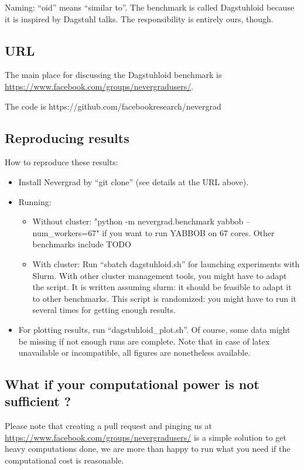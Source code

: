 \documentclass{article}
\begin{document}
Naming: “oid” means “similar to”. The benchmark is called Dagstuhloid because it is inspired by Dagstuhl talks. The responsibility is entirely ours, though.

\subsection{URL}
The main place for discussing the Dagstuhloid benchmark is \url{https://www.facebook.com/groups/nevergradusers/}. 

The code is https://github.com/facebookresearch/nevergrad

\subsection{Reproducing results}
How to reproduce these results:
\begin{itemize}
\item Install Nevergrad by “git clone” (see details at the URL above).
\item  Running:
\begin{itemize}
\item Without cluster: "python -m nevergrad.benchmark yabbob --num\_workers=67" if you want to run YABBOB on 67 cores. Other benchmarks include TODO
\item With cluster: Run “sbatch dagstuhloid.sh” for launching experiments with Slurm. With other cluster management tools, you might have to adapt the script. It is written assuming slurm: it should be feasible to adapt it to other benchmarks. This script is randomized: you might have to run it several times for getting enough results.
\end{itemize}
\item For plotting results, run “dagstuhloid\_plot.sh”. Of course, some data might be missing if not enough runs are complete. Note that in case of latex unavailable or incompatible, all figures are nonetheless available.
\end{itemize}

\subsection{What if your computational power is not sufficient ?}
Please note that creating a pull request and pinging us at \url{https://www.facebook.com/groups/nevergradusers/} is a simple solution to get heavy computations done, we are more than happy to run what you need if the computational cost is reasonable. 
\end{document}
